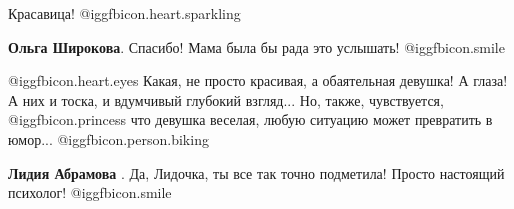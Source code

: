  
 
 
 
 

Красавица! @igg{fbicon.heart.sparkling} 

\textbf{Ольга Широкова}. Спасибо! Мама была бы рада это услышать!  @igg{fbicon.smile} 


@igg{fbicon.heart.eyes} Какая, не просто красивая, а обаятельная девушка! А
глаза! А них и тоска, и вдумчивый глубокий взгляд... Но, также, чувствуется,
 @igg{fbicon.princess} что девушка веселая, любую ситуацию может превратить в юмор... @igg{fbicon.person.biking} 

\textbf{Лидия Абрамова} . Да, Лидочка, ты все так точно подметила! Просто настоящий психолог!  @igg{fbicon.smile} 
